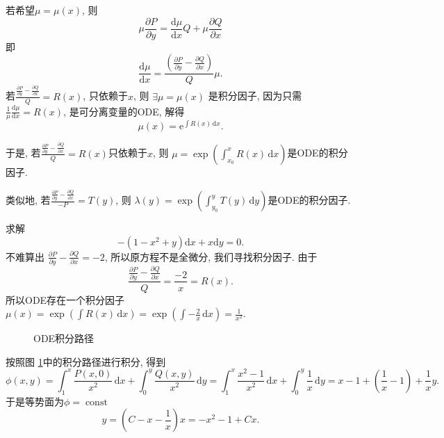 若希望$\mu = \mu(x)$, 则
\begin{equation}
  \mu \frac{\partial P}{\partial y} =\frac{\mathrm{d} \mu}{\mathrm{d} x} Q + \mu \frac{\partial Q}{\partial x}
\end{equation}
即
\begin{equation}
  \frac{\mathrm{d} \mu}{\mathrm{d} x} = \frac{\left( \frac{\partial P}{\partial y} - \frac{\partial Q}{\partial x} \right)}{Q} \mu .
\end{equation}
若$\frac{\frac{\partial P}{\partial y} - \frac{\partial Q}{\partial x}}{Q} = R(x)$, 只依赖于$x$, 则 $\exists \mu = \mu(x)$ 是积分因子, 因为只需 $\frac{1}{\mu} \frac{\mathrm{d} \mu}{\mathrm{d} x} = R(x)$, 是可分离变量的ODE, 解得
\begin{equation}
  \mu (x) = \mathrm{e}^{\int R(x)\, \mathrm{d} x}.
\end{equation}

于是, 若$\frac{\frac{\partial P}{\partial y} - \frac{\partial Q}{\partial x}}{Q} = R(x)$只依赖于$x$, 则 $\mu = \exp \left( \int_{x_0}^{x} R(x) \, \mathrm{d}x  \right)$是ODE的积分因子.

类似地, 若$\frac{\frac{\partial P}{\partial y} - \frac{\partial Q}{\partial x}}{- P} = T(y)$, 则 $\lambda(y) = \exp \left( \int_{y_0}^{y} T(y) \, \mathrm{d}y  \right)$是ODE的积分因子.

\begin{example}
  求解
  \begin{equation}
    - \left( 1-x^{2} + y \right)\mathrm{d} x + x \mathrm{d} y = 0.
  \end{equation}
  不难算出 $\frac{\partial P}{\partial y} - \frac{\partial Q}{\partial x} = -2$, 所以原方程不是全微分, 我们寻找积分因子. 由于
  \begin{equation}
    \frac{\frac{\partial P}{\partial y} - \frac{\partial Q}{\partial x}}{Q} = \frac{-2}{x} = R(x).
  \end{equation}
  所以ODE存在一个积分因子$\mu(x) = \exp \left( \int R(x) \, \mathrm{d} x \right) = \exp \left( \int -\frac{2}{x} \, \mathrm{d} x \right) = \frac{1}{x^{2}}$.

\begin{figure}[ht]
    \centering
    \caption{ODE积分路径}
    \label{fig:ode积分路径}
\end{figure}
按照图 \ref{fig:ode积分路径}中的积分路径进行积分, 得到
\begin{equation}
  \phi (x,y) = \int_{1}^{x} \frac{P(x,0)}{x^{2}} \, \mathrm{d}x + \int_{0}^{y} \frac{Q(x,y)}{x^{2}} \, \mathrm{d}y = \int_{1}^{x} \frac{x^{2}-1}{x^{2}} \, \mathrm{d}x + \int_{0}^{y} \frac{1}{x} \, \mathrm{d}y = x-1 + \left( \frac{1}{x} - 1 \right) + \frac{1}{x} y .
\end{equation}
于是等势面为$\phi = \operatorname{const}$
\begin{equation}
  y = \left( C - x - \frac{1}{x} \right)x = - x^{2} - 1 + Cx .
\end{equation}

\end{example}

